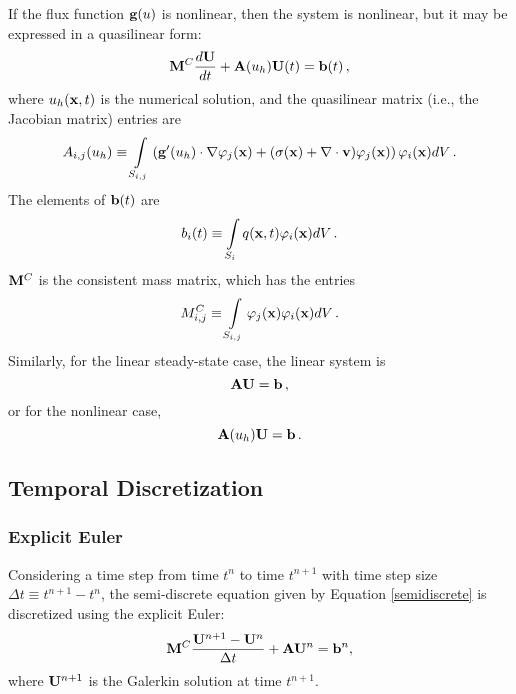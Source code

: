 If the flux function $\mathbf{g}(u)$ is nonlinear, then the system is
nonlinear, but it may be expressed in a quasilinear form:
\begin{equation}\label{eq:semi_quasilinear}
   \mathbf{M}^C\frac{d\mathbf{U}}{dt}+\mathbf{A}(u_h) \mathbf{U}(t) = \mathbf{b}(t) \,,
\end{equation}
where $u_h(\mathbf{x},t)$ is the numerical solution, and the quasilinear
matrix (i.e., the Jacobian matrix) entries are
\begin{equation}\label{eq:Aij_nonlinear}
A_{i,j}(u_h) \equiv \int\limits_{S_{i,j}}\left(
   \mathbf{g}'(u_h)\cdot\nabla\varphi_j(\mathbf{x}) +
   (\sigma(\mathbf{x})+\nabla\cdot\mathbf{v})\varphi_j(\mathbf{x})\right)\varphi_i(\mathbf{x}) dV \,.
\end{equation}
The elements of $\mathbf{b}(t)$ are
\begin{equation}
	b_i(t) \equiv \int\limits_{S_i} q(\mathbf{x},t)\varphi_i(\mathbf{x}) dV \,.
\end{equation}
$\mathbf{M}^C$ is the consistent mass matrix, which has the entries
\begin{equation}\label{massmatrix}
	M^C_{i,j} \equiv \int\limits_{S_{i,j}}
   \varphi_j(\mathbf{x})\varphi_i(\mathbf{x}) dV \,.
\end{equation}
Similarly, for the linear steady-state case, the linear system is
\begin{equation}
  \mathbf{A}\mathbf{U} = \mathbf{b} \,,
\end{equation}
or for the nonlinear case,
\begin{equation}
  \mathbf{A}(u_h)\mathbf{U} = \mathbf{b} \,.
\end{equation}
\subsection{Temporal Discretization}
\subsubsection{Explicit Euler}
Considering a time step from time $t^n$ to time $t^{n+1}$ with time step size
$\Delta t\equiv t^{n+1}-t^n$, the semi-discrete equation given by Equation
\eqref{semidiscrete} is discretized using the explicit Euler:
\begin{equation}\label{galerkin_FE}
   \mathbf{M}^C\frac{\mathbf{U}^{n+1}-\mathbf{U}^n}{\Delta t} + \mathbf{A}\mathbf{U}^n = \mathbf{b}^n,
\end{equation}
where $\mathbf{U}^{n+1}$ is the Galerkin solution at time $t^{n+1}$.
